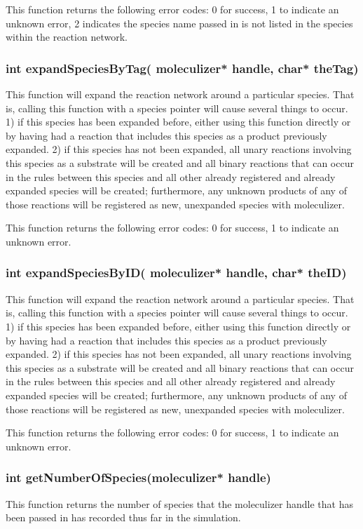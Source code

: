 This function returns the following error codes: 0 for success, 1 to
indicate an unknown error, 2 indicates the species name passed in is
not listed in the species within the reaction network.

\subsubsection{int expandSpeciesByTag( moleculizer* handle, char* theTag)}
This function will expand the reaction network around a particular
species.  That is, calling this function with a species pointer will
cause several things to occur.  1) if this species has been expanded
before, either using this function directly or by having had a
reaction that includes this species as a product previously expanded.
2) if this species has not been expanded, all unary reactions
involving this species as a substrate will be created and all binary
reactions that can occur in the rules between this species and all
other already registered and already expanded species will be created;
furthermore, any unknown products of any of those reactions will be
registered as new, unexpanded species with moleculizer.  

This function returns the following error codes: 0 for success, 1 to
indicate an unknown error.

\subsubsection{int expandSpeciesByID( moleculizer* handle, char* theID)}
This function will expand the reaction network around a particular
species.  That is, calling this function with a species pointer will
cause several things to occur.  1) if this species has been expanded
before, either using this function directly or by having had a
reaction that includes this species as a product previously expanded.
2) if this species has not been expanded, all unary reactions
involving this species as a substrate will be created and all binary
reactions that can occur in the rules between this species and all
other already registered and already expanded species will be created;
furthermore, any unknown products of any of those reactions will be
registered as new, unexpanded species with moleculizer.  

This function returns the following error codes: 0 for success, 1 to
indicate an unknown error.

\subsubsection{int getNumberOfSpecies(moleculizer* handle)}
This function returns the number of species that the moleculizer
handle that has been passed in has recorded thus far in the
simulation.

